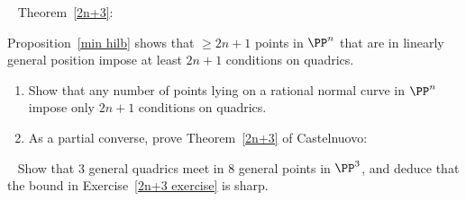 \begin{exercise}~\label{2n+3 exercise}
Theorem~\ref{2n+3}:

Proposition~\ref{min hilb} shows that $\geq 2n+1$ points in $\PP^n$ that are in linearly general position impose at least $2n+1$ conditions on quadrics. 
\begin{enumerate}
 \item Show that
any number of points lying on a rational normal curve in $\PP^n$ impose only $2n+1$ conditions on quadrics. 
\item As a partial converse, prove Theorem~\ref{2n+3} of Castelnuovo:
 \end{enumerate}
\end{exercise}


\begin{exercise}~\label{2n+3 is sharp}
Show that 3 general quadrics meet in 8 general points in $\PP^3$, and deduce that the bound in Exercise~\ref{2n+3 exercise}
is sharp.
\end{exercise}


